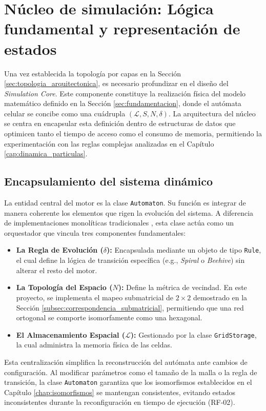 \section{Núcleo de simulación: Lógica fundamental y representación de estados}
\label{sec:nucleo_simulacion}

Una vez establecida la topología por capas en la Sección \ref{sec:topologia_arquitectonica}, es necesario profundizar en el diseño del \textit{Simulation Core}. Este componente constituye la realización física del modelo matemático definido en la Sección \ref{sec:fundamentacion}, donde el autómata celular se concibe como una cuádrupla $(\mathcal{L}, S, N, \delta)$. La arquitectura del núcleo se centra en encapsular esta definición dentro de estructuras de datos que optimicen tanto el tiempo de acceso como el consumo de memoria, permitiendo la experimentación con las reglas complejas analizadas en el Capítulo \ref{cap:dinamica_particulas}.

\subsection{Encapsulamiento del sistema dinámico}

La entidad central del motor es la clase \texttt{Automaton}. Su función es integrar de manera coherente los elementos que rigen la evolución del sistema. A diferencia de implementaciones monolíticas tradicionales \cite{Basurto2009}, esta clase actúa como un orquestador que vincula tres componentes fundamentales:

\begin{itemize}
    \item \textbf{La Regla de Evolución ($\delta$):} Encapsulada mediante un objeto de tipo \texttt{Rule}, el cual define la lógica de transición específica (e.g., \textit{Spiral} o \textit{Beehive}) sin alterar el resto del motor.
    \item \textbf{La Topología del Espacio ($N$):} Define la métrica de vecindad. En este proyecto, se implementa el mapeo submatricial de $2 \times 2$ demostrado en la Sección \ref{subsec:correspondencia_submatricial}, permitiendo que una red ortogonal se comporte isomorfamente como una hexagonal.
    \item \textbf{El Almacenamiento Espacial ($\mathcal{L}$):} Gestionado por la clase \texttt{GridStorage}, la cual administra la memoria física de las celdas.
\end{itemize}

Esta centralización simplifica la reconstrucción del autómata ante cambios de configuración. Al modificar parámetros como el tamaño de la malla o la regla de transición, la clase \texttt{Automaton} garantiza que los isomorfismos establecidos en el Capítulo \ref{chap:isomorfismos} se mantengan consistentes, evitando estados inconsistentes durante la reconfiguración en tiempo de ejecución (RF-02).

